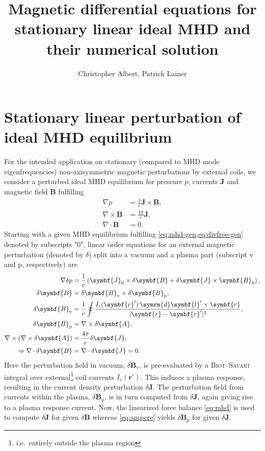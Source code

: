 \documentclass[a4paper, twoside, 10pt, english]{article}
\title{Magnetic differential equations for stationary linear ideal MHD and their numerical solution}
\author{Christopher Albert, Patrick Lainer}
\numberwithin{equation}{section}
\let\vec\symbf
\newcommand*\grad{\ensuremath{\nabla}}
\newcommand*\divg{\ensuremath{\nabla \cdot}}
\newcommand*\curl{\ensuremath{\nabla \times}}
\newcommand*\diff{\ensuremath{\symrm{d}}}  %
\newcommand*\Bvac{\ensuremath{\delta \vec{B}_{\text{v}}}}  %
\newcommand*\Bplas{\ensuremath{\delta \vec{B}_{\text{p}}}}  %
\newcommand*\Bpert{\ensuremath{\delta \vec{B}}}  %
\begin{document}
\maketitle
\tableofcontents

\newpage
\section{Stationary linear perturbation of ideal MHD equilibrium}

For the intended application on stationary (compared to MHD mode eigenfrequencies) non-axisymmetric magnetic perturbations by external coils, we consider a perturbed ideal MHD equilibrium for pressure $p$, currents $\vec{J}$ and magnetic field $\vec{B}$ fulfilling
\begin{align}
  \grad p &= \frac{1}{c} \vec{J} \times \vec{B}, \label{eq:mhd-gen} \\
  \curl \vec{B} &= \frac{4 \pi}{c} \vec{J}, \label{eq:ampere-gen} \\
  \divg \vec{B} &= 0. \label{eq:divfree-gen}
\end{align}
Starting with a given MHD equilibrium fulfilling \cref{eq:mhd-gen,eq:divfree-gen} denoted by subscripts "$0$", linear order equations for an external magnetic perturbation (denoted by $\delta$) split into a vacuum and a plasma part (subscript $\text{v}$ and $\text{p}$, respectively) are
\begin{align}
  \grad \delta p &= \frac{1}{c} \left( \vec{J}_{0} \times \Bpert + \delta \vec{J} \times \vec{B}_{0} \right), \label{eq:mhd} \\
  \Bpert &= \Bvac + \Bplas, \\
  \Bvac &= \frac{1}{c} \oint \frac{I_{\text{c}}(\vec{r}') \, \diff \vec{l}' \times \vec{r}}{\lvert \vec{r} - \vec{r}' \rvert^{3}}, \label{eq:biot-savart} \\
  \Bplas &= \curl \delta \vec{A}, \\
  \curl (\curl \delta \vec{A}) &= \frac{4 \pi}{c} \delta \vec{J}, \label{eq:ampere} \\
  \Rightarrow \divg \Bpert &= \divg \delta \vec{J} = 0. \label{eq:divfree}
\end{align}
Here the perturbation field in vacuum, $\Bvac$, is pre-evaluated by a \textsc{Biot}--\textsc{Savart} integral over external\footnote{i.e.\ entirely outside the plasma region} coil currents $I_{\text{c}} (\vec{r}')$. This induces a plasma response, resulting in the current density perturbation $\delta \vec{J}$. The perturbation field from currents within the plasma, $\Bplas$, is in turn computed from $\delta \vec{J}$, again giving rise to a plasma response current. Now, the linearized force balance \cref{eq:mhd} is used to compute $\delta \vec{J}$ for given $\Bpert$ whereas \cref{eq:ampere} yields $\Bplas$ for given $\delta \vec{J}$.
\end{document}
